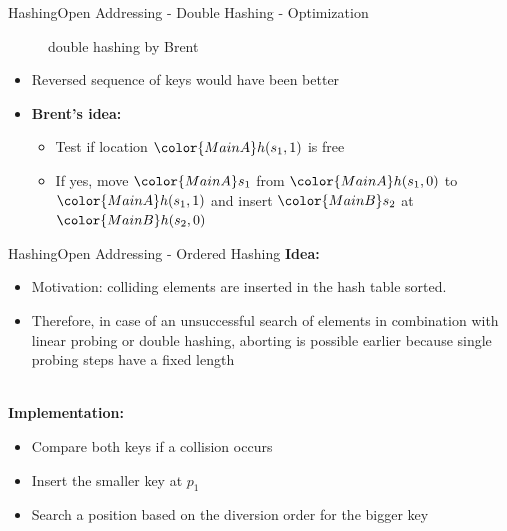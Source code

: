 
\begin{frame}{Hashing}{Open Addressing - Double Hashing - Optimization}
  \vspace{-2.0em}
  \begin{figure}[!h]
    \begin{adjustbox}{width=0.9\linewidth}%
    \end{adjustbox}
    \vspace{-1.0em}
    \caption{double hashing by Brent}%
    \label{fig:hashing:open_addressing:double_hashing_brent}%
  \end{figure}
  \vspace{-1.0em}
  \begin{itemize}
  \item<4->
    Reversed sequence of keys would have been better
  \item<5->
    \textbf{Brent's idea:}
    \begin{itemize}
    \item<6->
      Test if location ${\color{MainA}h(s_1, 1)}$ is free
    \item<7->
      If yes, move ${\color{MainA}s_1}$ from
      ${\color{MainA}h(s_1, 0)}$ to ${\color{MainA}h(s_1, 1)}$
      and insert ${\color{MainB}s_2}$ at
      ${\color{MainB}h(s_2, 0)}$
    \end{itemize}
  \end{itemize}  
\end{frame}


\begin{frame}{Hashing}{Open Addressing - Ordered Hashing}
  \textbf{ Idea:}
  \begin{itemize}
    \item Motivation:
      colliding elements are inserted in the hash table sorted. 
    \item
      Therefore, in case of an unsuccessful search of elements
      in combination with linear probing or double hashing,
      aborting is possible earlier because single probing steps
      have a fixed length
  \end{itemize}
  \hfill\\[0.5em]
  \textbf{Implementation:}
  \begin{itemize}
    \item
      Compare both keys if a collision occurs
    \item
      Insert the smaller key at $p_1$
    \item
      Search a position based on the diversion order for the bigger key
  \end{itemize}
\end{frame}

